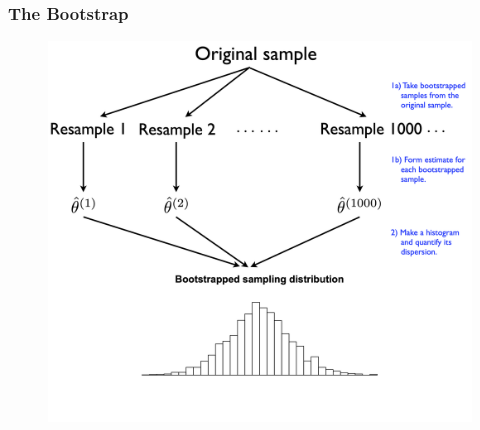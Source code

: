 \documentclass[
  shownotes,
  xcolor={svgnames},
  hyperref={colorlinks,citecolor=DarkBlue,linkcolor=andesred,urlcolor=DarkBlue}
  , aspectratio=169]{beamer}
\begin{document}
\begin{frame}[fragile]
\frametitle{The Bootstrap}


\begin{figure}
  \includegraphics[scale=.4]{figures/bootstrapping_schematic.png}
\end{figure}





 \end{frame}
\end{document}
